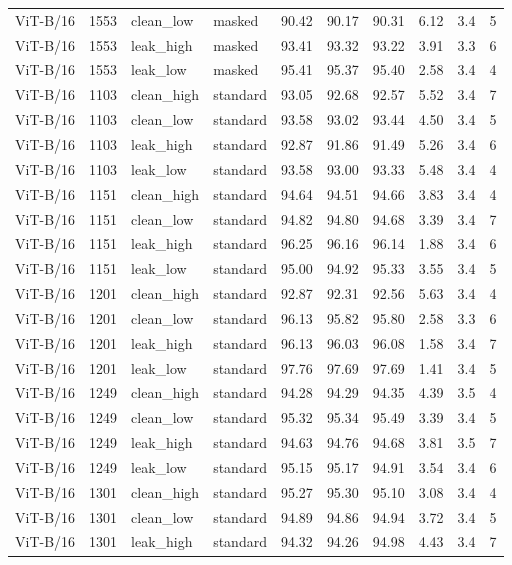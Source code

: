 {\begin{longtable}{lrllrrrrrr}
ViT-B/16 & 1553 & clean\_low & masked & 90.42 & 90.17 & 90.31 & 6.12 & 3.4 & 5 \\
ViT-B/16 & 1553 & leak\_high & masked & 93.41 & 93.32 & 93.22 & 3.91 & 3.3 & 6 \\
ViT-B/16 & 1553 & leak\_low & masked & 95.41 & 95.37 & 95.40 & 2.58 & 3.4 & 4 \\
ViT-B/16 & 1103 & clean\_high & standard & 93.05 & 92.68 & 92.57 & 5.52 & 3.4 & 7 \\
ViT-B/16 & 1103 & clean\_low & standard & 93.58 & 93.02 & 93.44 & 4.50 & 3.4 & 5 \\
ViT-B/16 & 1103 & leak\_high & standard & 92.87 & 91.86 & 91.49 & 5.26 & 3.4 & 6 \\
ViT-B/16 & 1103 & leak\_low & standard & 93.58 & 93.00 & 93.33 & 5.48 & 3.4 & 4 \\
ViT-B/16 & 1151 & clean\_high & standard & 94.64 & 94.51 & 94.66 & 3.83 & 3.4 & 4 \\
ViT-B/16 & 1151 & clean\_low & standard & 94.82 & 94.80 & 94.68 & 3.39 & 3.4 & 7 \\
ViT-B/16 & 1151 & leak\_high & standard & 96.25 & 96.16 & 96.14 & 1.88 & 3.4 & 6 \\
ViT-B/16 & 1151 & leak\_low & standard & 95.00 & 94.92 & 95.33 & 3.55 & 3.4 & 5 \\
ViT-B/16 & 1201 & clean\_high & standard & 92.87 & 92.31 & 92.56 & 5.63 & 3.4 & 4 \\
ViT-B/16 & 1201 & clean\_low & standard & 96.13 & 95.82 & 95.80 & 2.58 & 3.3 & 6 \\
ViT-B/16 & 1201 & leak\_high & standard & 96.13 & 96.03 & 96.08 & 1.58 & 3.4 & 7 \\
ViT-B/16 & 1201 & leak\_low & standard & 97.76 & 97.69 & 97.69 & 1.41 & 3.4 & 5 \\
ViT-B/16 & 1249 & clean\_high & standard & 94.28 & 94.29 & 94.35 & 4.39 & 3.5 & 4 \\
ViT-B/16 & 1249 & clean\_low & standard & 95.32 & 95.34 & 95.49 & 3.39 & 3.4 & 5 \\
ViT-B/16 & 1249 & leak\_high & standard & 94.63 & 94.76 & 94.68 & 3.81 & 3.5 & 7 \\
ViT-B/16 & 1249 & leak\_low & standard & 95.15 & 95.17 & 94.91 & 3.54 & 3.4 & 6 \\
ViT-B/16 & 1301 & clean\_high & standard & 95.27 & 95.30 & 95.10 & 3.08 & 3.4 & 4 \\
ViT-B/16 & 1301 & clean\_low & standard & 94.89 & 94.86 & 94.94 & 3.72 & 3.4 & 5 \\
ViT-B/16 & 1301 & leak\_high & standard & 94.32 & 94.26 & 94.98 & 4.43 & 3.4 & 7 \\

\end{longtable}}
